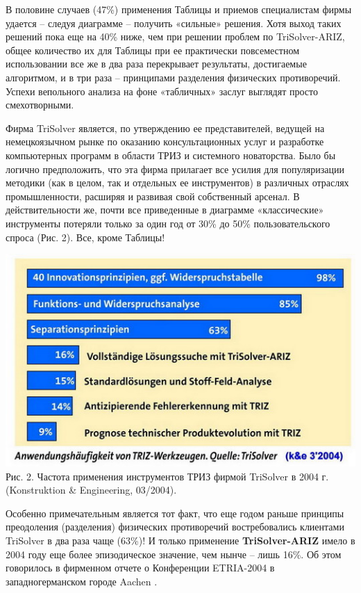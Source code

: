 \documentclass[11pt,a4paper]{article}
\begin{document}
В половине случаев (47\%) применения Таблицы и приемов специалистам фирмы
удается -- следуя диаграмме -- получить «сильные» решения. Хотя выход таких
решений пока еще на 40\% ниже, чем при решении проблем по TriSolver-ARIZ,
общее количество их для Таблицы при ее практически повсеместном использовании
все же в два раза перекрывает результаты, достигаемые алгоритмом, и в три раза
-- принципами разделения физических противоречий. Успехи вепольного анализа на
фоне «табличных» заслуг выглядят просто смехотворными.

Фирма TriSolver является, по утверждению ее представителей, ведущей на
немецкоязычном рынке по оказанию консультационных услуг и разработке
компьютерных программ в области ТРИЗ и системного новаторства. Было бы логично
предположить, что эта фирма прилагает все усилия для популяризации методики
(как в целом, так и отдельных ее инструментов) в различных отраслях
промышленности, расширяя и развивая свой собственный арсенал. В
действительности же, почти все приведенные в диаграмме «классические»
инструменты потеряли только за один год от 30\% до 50\% пользовательского
спроса (Рис. 2). Все, кроме Таблицы!

\begin{center}
  \includegraphics[width=.8\textwidth]{./3.jpg} \\
  Рис. 2. Частота применения инструментов ТРИЗ фирмой TriSolver в 2004 г.
  (Konstruktion \& Engineering, 03/2004).
\end{center}

Особенно примечательным является тот факт, что еще годом раньше принципы
преодоления (разделения) физических противоречий востребовались клиентами
TriSolver в два раза чаще (63\%)! И только применение \textbf{TriSolver-ARIZ}
имело в 2004 году еще более эпизодическое значение, чем нынче -- лишь 16\%. Об
этом говорилось в фирменном отчете о Конференции ETRIA-2004 в
западногерманском городе Aachen \cite{Livotov2004}.
\end{document}
